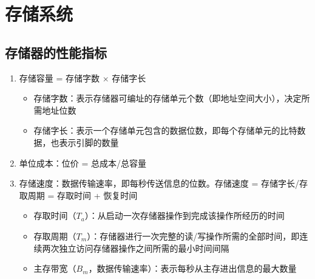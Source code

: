 \documentclass[./computer-organization-and-architecture.tex]{subfiles}
\begin{document}
    \section{存储系统}

    \subsection{存储器的性能指标}

    \begin{enumerate}
        \item 存储容量 = 存储字数 $\times$ 存储字长
        \begin{itemize}
            \item 存储字数：表示存储器可编址的存储单元个数（即地址空间大小），决定所需地址位数
            \item 存储字长：表示一个存储单元包含的数据位数，即每个存储单元的比特数据，也表示{\color{red}{数据}}引脚的数量
        \end{itemize}
        \item 单位成本：位价 = 总成本/总容量
        \item 存储速度：数据传输速率，即每秒传送信息的位数。存储速度 = 存储字长/存取周期 = 存取时间 + 恢复时间
        \begin{itemize}
            \item 存取时间（$T_a$）：从启动一次存储器操作到完成该操作所经历的时间
            \item 存取周期（$T_m$）：存储器进行一次完整的读/写操作所需的全部时间，即连续两次独立访问存储器操作之间所需的最小时间间隔
            \item 主存带宽（$B_m$，数据传输速率）：表示每秒从主存进出信息的最大数量
        \end{itemize}
    \end{enumerate}
\end{document}
